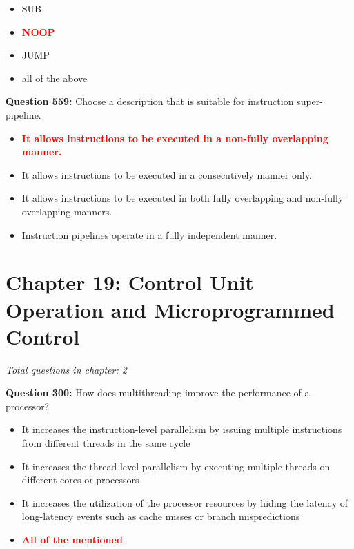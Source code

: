 \documentclass[12pt,a4paper]{article}
\begin{document}
\begin{itemize}
    \item[\textbf{A.}] SUB
    \item[\textbf{B.}] \textcolor{red}{\textbf{NOOP}}
    \item[\textbf{C.}] JUMP
    \item[\textbf{D.}] all of the above
\end{itemize}

\vspace{0.5cm}

\vspace{0.5cm}



\textbf{Question 559:} Choose a description that is suitable for instruction super-pipeline.

\begin{itemize}
    \item[\textbf{A.}] \textcolor{red}{\textbf{It allows instructions to be executed in a non-fully overlapping manner.}}
    \item[\textbf{B.}] It allows instructions to be executed in a consecutively manner only.
    \item[\textbf{C.}] It allows instructions to be executed in both fully overlapping and non-fully overlapping manners.
    \item[\textbf{D.}] Instruction pipelines operate in a fully independent manner.
\end{itemize}

\section{Chapter 19: Control Unit Operation and Microprogrammed Control}
\textit{Total questions in chapter: 2}

\textbf{Question 300:} How does multithreading improve the performance of a processor?

\begin{itemize}
    \item[\textbf{A.}] It increases the instruction-level parallelism by issuing multiple instructions from different threads in the same cycle
    \item[\textbf{B.}] It increases the thread-level parallelism by executing multiple threads on different cores or processors
    \item[\textbf{C.}] It increases the utilization of the processor resources by hiding the latency of long-latency events such as cache misses or branch mispredictions
    \item[\textbf{D.}] \textcolor{red}{\textbf{All of the mentioned}}
\end{itemize}
\end{document}
